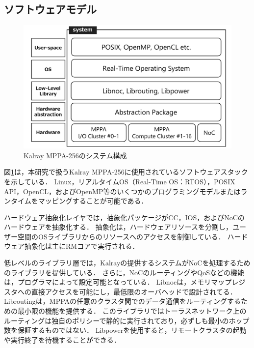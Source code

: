\documentclass[submit,techrep]{ipsj_v2/UTF8/ipsj}
\begin{document}
\subsection{ソフトウェアモデル}
\label{sec:software_model}

\begin{figure}[t]
  \centering
  \includegraphics[width=0.8\linewidth]{../figure/softwarestack.pdf}
  \caption{\label{fig:software_stack}
    Kalray MPPA-256のシステム構成}
\end{figure}

図\ref{fig:software_stack}は，本研究で扱うKalray MPPA-256に使用されているソフトウェアスタックを示している．
Linux，リアルタイムOS（Real-Time OS：RTOS），POSIX API，OpenCL，およびOpenMP等のいくつかのプログラミングモデルまたはランタイムをマッピングすることが可能である．

ハードウェア抽象化レイヤでは，抽象化パッケージがCC，IOS，およびNoCのハードウェアを抽象化する．
抽象化は，ハードウェアリソースを分割し，ユーザー空間のOSライブラリからのリソースへのアクセスを制御している．
ハードウェア抽象化は主にRMコアで実行される．

低レベルのライブラリ層では，Kalrayの提供するシステムがNoCを処理するためのライブラリを提供している．
さらに，NoCのルーティングやQoSなどの機能は，プログラマによって設定可能となっている．
Libnocは，メモリマップレジスタへの直接アクセスを可能にし，最低限のオーバヘッドで設計されてる．
Libroutingは，MPPAの任意のクラスタ間でのデータ通信をルーティングするための最小限の機能を提供する．
このライブラリではトーラスネットワーク上のルーティングは独自のポリシーで静的に実行されており，必ずしも最小のホップ数を保証するものではない．
Libpowerを使用すると，リモートクラスタの起動や実行終了を待機することができる．
\end{document}

